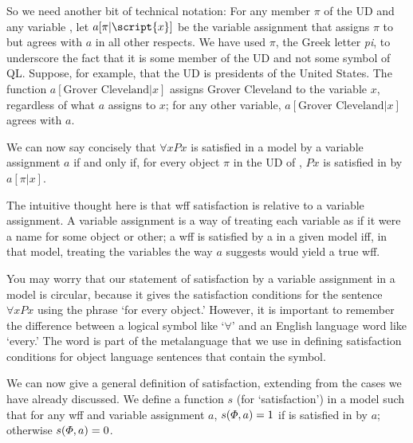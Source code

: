 So we need another bit of technical notation: For any member $\pi$ of the UD and any variable , let $a[\pi|\script{x}]$ be the variable assignment that assigns $\pi$ to  but agrees with $a$ in all other respects. We have used $\pi$, the Greek letter \emph{pi}, to underscore the fact that it is some member of the UD and not some symbol of QL. Suppose, for example, that the UD is presidents of the United States. The function $a[\mbox{Grover Cleveland}|x]$ assigns Grover Cleveland to the variable $x$, regardless of what $a$ assigns to $x$; for any other variable, $a[\mbox{Grover Cleveland}|x]$ agrees with $a$.

We can now say concisely that $\forall x Px$ is satisfied in a model  by a variable assignment $a$ if and only if, for every object $\pi$ in the UD of , $Px$ is satisfied in  by $a[\pi|x]$.

The intuitive thought here is that wff satisfaction is relative to a variable assignment. A variable assignment is a way of treating each variable as if it were a name for some object or other; a wff is satisfied by a in a given model iff, in that model, treating the variables the way $a$ suggests would yield a true wff.

You may worry that our statement of satisfaction by a variable assignment in a model is circular, because it gives the satisfaction conditions for the sentence $\forall x Px$ using the phrase `for every object.' However, it is important to remember the difference between a logical symbol like `$\forall$' and an English language word like `every.' The word is part of the metalanguage that we use in defining satisfaction conditions for object language sentences that contain the symbol.

We can now give a general definition of satisfaction, extending from the cases we have already discussed. We define a function $s$ (for `satisfaction') in a model  such that for any wff \metaA{} and variable assignment $a$, $s(\varPhi{}, a)=1$ if \metaA{} is satisfied in  by $a$; otherwise $s(\varPhi{}, a)=0$.

